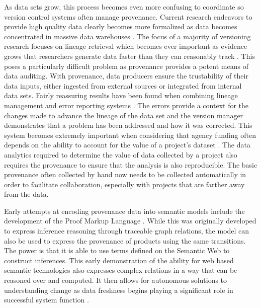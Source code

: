 As data sets grow, this process becomes even more confusing to coordinate so version control systems often manage provenance.
Current research endeavors to provide high quality data clearly becomes more formalized as data becomes concentrated in massive data warehouses \cite{Vassiliadis1999}.
The focus of a majority of versioning research focuses on lineage retrieval which becomes ever important as evidence grows that researchers generate data faster than they can reasonably track \cite{Bose:2005:LRS:1057977.1057978}.
This poses a particularly difficult problem as provenance provides a potent means of data auditing.
With provenance, data producers ensure the trustability of their data inputs, either ingested from external sources or integrated from internal data sets.
Fairly reassuring results have been found when combining lineage management and error reporting systems \cite{Fischer2003}.
The errors provide a context for the changes made to advance the lineage of the data set and the version manager demonstrates that a problem has been addressed and how it was corrected.
This system becomes extremely important when considering that agency funding often depends on the ability to account for the value of a project's dataset \cite{Cavanaugh2002}.
The data analytics required to determine the value of data collected by a project also requires the provenance to ensure that the analysis is also reproducible.
The basic provenance often collected by hand now needs to be collected automatically in order to facilitate collaboration, especially with projects that are farther away from the data.

Early attempts at encoding provenance data into semantic models include the development of the Proof Markup Language \cite{daSilva2006381}.
While this was originally developed to express inference reasoning through traceable graph relations, the model can also be used to express the provenance of products using the same transitions.
The power is that it is able to use terms defined on the Semantic Web to construct inferences.
This early demonstration of the ability for web based semantic technologies also expresses complex relations in a way that can be reasoned over and computed.
It then allows for autonomous solutions to understanding change as data freshness begins playing a significant role in successful system function \cite{Bouzeghoub:2004:FAD:1012453.1012464}.

